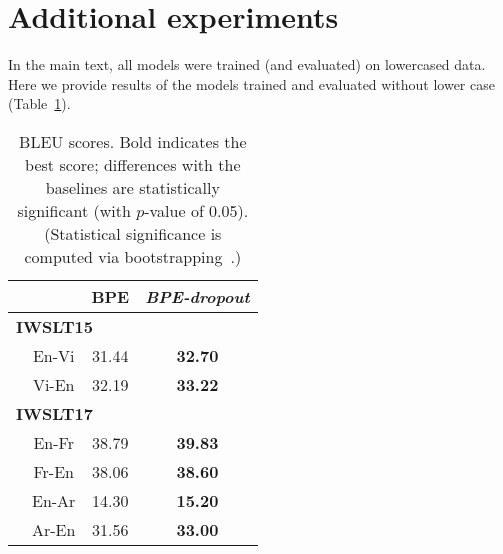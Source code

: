 \documentclass[11pt,a4paper]{article}
\begin{document}
\section{Additional experiments}

In the main text, all models were trained (and evaluated) on lowercased data. Here we provide results of the models trained and evaluated without lower case (Table~\ref{tab:main_no_lowersace}).

\begin{table}[h!]
\centering
\begin{tabular}{lccc}
\toprule
& & BPE  & \textit{BPE-dropout}\\

\midrule
\multicolumn{4}{l}{\!\!\!\bf IWSLT15}\\
& En-Vi & 31{.}44 & \bf{32{.}70} \\
& Vi-En & 32{.}19 & \bf{33{.}22} \\
\midrule
\multicolumn{4}{l}{\!\!\!\bf IWSLT17}\\
& En-Fr & 38{.}79 &	\bf{39{.}83} \\
& Fr-En & 38{.}06 &	\bf{38{.}60} \\
& En-Ar & 14.30 & \bf{15.20} \\
& Ar-En & 31.56 & \bf{33.00} \\

\bottomrule
\end{tabular}
\caption{BLEU scores. Bold indicates the best score; differences with the baselines are statistically significant (with $p$-value of 0.05). (Statistical significance is computed via bootstrapping~\cite{koehn2004statistical}.)}
\label{tab:main_no_lowersace}
\end{table} 
\end{document}

